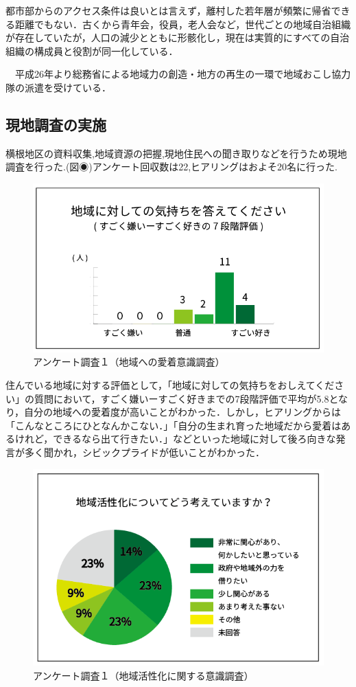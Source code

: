 \documentclass[a4paper]{jsarticle}
\begin{document}
都市部からのアクセス条件は良いとは言えず，離村した若年層が頻繁に帰省できる距離でもない．古くから青年会，役員，老人会など，世代ごとの地域自治組織が存在していたが，人口の減少とともに形骸化し，現在は実質的にすべての自治組織の構成員と役割が同一化している．\par
　平成26年より総務省による地域力の創造・地方の再生の一環で地域おこし協力隊の派遣を受けている．



\subsection{現地調査の実施}
横根地区の資料収集,地域資源の把握,現地住民への聞き取りなどを行うため現地調査を行った.(図◉)アンケート回収数は22,ヒアリングはおよそ20名に行った.\par

\begin{figure}[H]
  \begin{center}
    \includegraphics[width=0.8\hsize]{./images/03.png}
    \caption{アンケート調査１（地域への愛着意識調査）}
    \label{fig:tmu_hino}
  \end{center}
\end{figure}
住んでいる地域に対する評価として，「地域に対しての気持ちをおしえてください」の質問において，すごく嫌いーすごく好きまでの7段階評価で平均が5.8となり，自分の地域への愛着度が高いことがわかった．しかし，ヒアリングからは「こんなところにひとなんかこない．」「自分の生まれ育った地域だから愛着はあるけれど，できるなら出て行きたい．」などといった地域に対して後ろ向きな発言が多く聞かれ，シビックプライドが低いことがわかった．
\begin{figure}[H]
  \begin{center}
    \includegraphics[width=0.8\hsize]{./images/02.png}
    \caption{アンケート調査１（地域活性化に関する意識調査）}
    \label{fig:tmu_hino}
  \end{center}
\end{figure}
\end{document}

